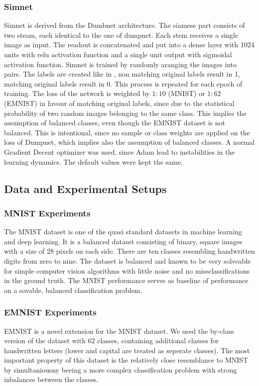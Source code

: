 \documentclass[a4paper,pt12]{article}
\begin{document}
\subsubsection{Simnet}
Simnet is derived from the Dumbnet architecture. The siamese part consists of two steam, each identical to the one of dumpnet. Each stem receives a single image as input. The readout is concatenated and put into a dense layer with 1024 units with relu activation function and a single unit output with sigmoidal activation function. \newline
Simnet is trained by randomly aranging the images into pairs. The labels are created like in \cite{siamese}, non matching original labels result in 1, matching original labels result in 0. This process is repeated for each epoch of training. \newline
The loss of the network is weighted by $1:10$ (MNIST) or $1:62$ (EMNIST) in favour of matching original labels, since due to the statistical probability of two random images belonging to the same class. This implies the assumption of balanced classes, even though the EMNIST dataset is not balanced. This is intentional, since no sample or class weights are applied on the loss of Dumpnet, which implies also the assumption of balanced classes. \newline
A normal Gradient Decent optimizer was used, since Adam lead to instabilities in the learning dynamics. The default values were kept the same.

\subsection{Data and Experimental Setups}

\subsubsection{MNIST Experiments}
The MNIST dataset is one of the quasi standard datasets in machine learning and deep learning. It is a balanced dataset consisting of binary, square images with a size of 28 pixels on each side. There are ten classes resembling handwritten digits from zero to nine. The dataset is balanced and known to be very solveable for simple computer vision algorithms with little noise and no missclassifications in the ground truth. \newline
The MNIST performance serves as baseline of performance on a sovable, balanced classification problem. 

\subsubsection{EMNIST Experiments}
EMNIST is a novel extension for the MNIST dataset. We used the by-class version of the dataset with 62 classes, containing additional classes for handwritten letters (lower and capital are treated as seperate classes). The most important property of this dataset is the relatively close resemblance to MNIST by simultaniousny beeing a more complex classification problem with strong inbalances between the classes.
\end{document}
